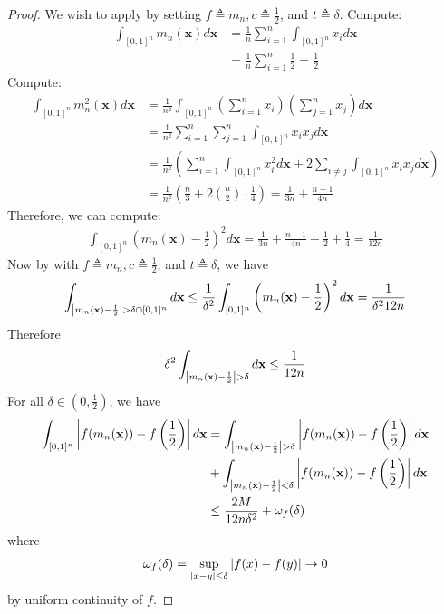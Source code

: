 \documentclass{report}
\begin{document}
\begin{proof}
We wish to apply  by setting $f\triangleq m_n,c\triangleq \frac{1}{2}$, and $t \triangleq \delta$. Compute:  
\begin{align*}
\int_{[0,1]^n }m_n(\textbf{x})d\textbf{x} &= \frac{1}{n} \sum_{i=1}^n \int_{[0,1]^n} x_i d\textbf{x} \\
&=\frac{1}{n} \sum_{i=1}^n \frac{1}{2} = \frac{1}{2}
\end{align*}
Compute: 
\begin{align*}
\int_{[0,1]^n} m_n^2(\textbf{x})d\textbf{x} &= \frac{1}{n^2} \int_{[0,1]^n}\left(\sum_{i=1}^n x_i \right) \left(\sum_{j=1}^n x_j \right) d\textbf{x} \\
&=\frac{1}{n^2} \sum_{i=1}^n \sum_{j=1}^n \int_{[0,1]^n}x_ix_j d\textbf{x} \\
&=\frac{1}{n^2} \left(\sum_{i=1}^n \int_{[0,1]^n} x_i^2 d \textbf{x} + 2\sum_{i \neq j}\int_{[0,1]^n}x_ix_j d\textbf{x}   \right) \\
&=\frac{1}{n^2} \left( \frac{n}{3}+2 \binom{n}{2} \cdot \frac{1}{4}  \right) = \frac{1}{3n}+ \frac{n-1}{4n}
\end{align*}
Therefore, we can compute:
\begin{align*}
\int_{[0,1]^n} \left(m_n(\textbf{x}) - \frac{1}{2} \right)^2 d \textbf{x}  = \frac{1}{3n} + \frac{n-1}{4n} - \frac{1}{2} + \frac{1}{4} = \frac{1}{12n}
\end{align*}
Now by  with $f\triangleq m_n,c\triangleq \frac{1}{2}$, and $t \triangleq \delta$, we have 
\begin{align*}
\int_{\abso{m_n(\textbf{x})-\frac{1}{2}}> \delta \cap  [0,1]^n}  d \textbf{x} \leq \frac{1}{\delta^2} \int_{[0,1]^n} \left( m_n(\textbf{x})- \frac{1}{2} \right)^2  d \textbf{x}= \frac{1}{\delta^212n} 
\end{align*}
Therefore 
\begin{align*}
\delta^2 \int_{\left|m_n(\textbf{x})- \frac{1}{2}\right| > \delta} d\textbf{x}\leq \frac{1}{12n}
\end{align*}
For all $\delta \in (0,\frac{1}{2})$, we have 
\begin{align*}
  \int_{[0,1]^n} \abso{f(m_n(\textbf{x})) - f\left(\frac{1}{2} \right) } d \textbf{x} &= \int_{\abso{m_n(\textbf{x}) - \frac{1}{2}}> \delta}  \abso{f(m_n(\textbf{x})) - f\left(\frac{1}{2} \right) } d \textbf{x} \\
  &+ \int_{\abso{m_n(\textbf{x})-\frac{1}{2}} < \delta} \abso{f(m_n(\textbf{x}))- f \left(\frac{1}{2} \right)} d\textbf{x} \\
  &\leq \frac{2M}{12n \delta^2}  + \omega_f (\delta)
\end{align*}
where 
\begin{align*}
\omega_f (\delta)= \sup_{\left|x-y\right|\leq \delta} \left|f(x)-f(y)\right| \rightarrow 0 
\end{align*}
by uniform continuity of $f$. 
\end{proof}
\end{document}
